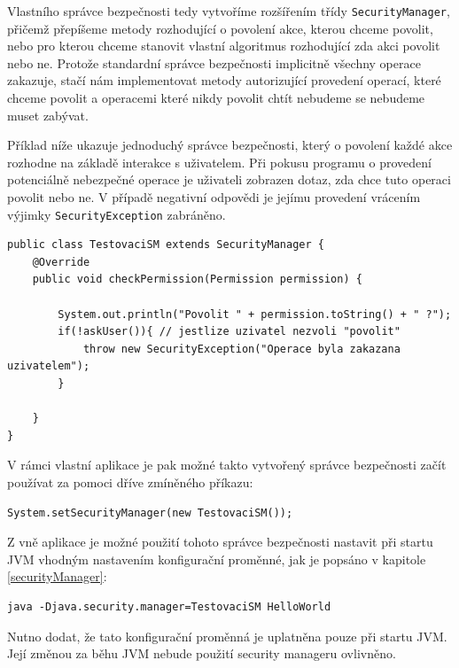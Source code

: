 Vlastního správce bezpečnosti tedy vytvoříme rozšířením třídy {\tt SecurityManager}, přičemž přepíšeme metody rozhodující o povolení akce, kterou chceme povolit, nebo pro kterou chceme stanovit vlastní algoritmus rozhodující zda akci povolit nebo ne.
Protože standardní správce bezpečnosti implicitně všechny operace zakazuje, stačí nám implementovat metody autorizující provedení operací, které chceme povolit a operacemi které nikdy povolit chtít nebudeme se nebudeme muset zabývat.

Příklad níže ukazuje jednoduchý správce bezpečnosti, který o povolení každé akce rozhodne na základě interakce s uživatelem. Při pokusu programu o provedení potenciálně nebezpečné operace je uživateli zobrazen dotaz, zda chce tuto operaci povolit nebo ne. V případě negativní odpovědi je jejímu provedení vrácením výjimky {\tt SecurityException} zabráněno.

\begin{lstlisting}[caption=Jednoduchý správce bezpečnosti, label=TestovaciSM]
public class TestovaciSM extends SecurityManager {
	@Override
	public void checkPermission(Permission permission) {
		
		System.out.println("Povolit " + permission.toString() + " ?");
		if(!askUser()){ // jestlize uzivatel nezvoli "povolit"
			throw new SecurityException("Operace byla zakazana uzivatelem");
		}
		
	}
}
\end{lstlisting}

V rámci vlastní aplikace je pak možné takto vytvořený správce bezpečnosti začít používat za pomoci dříve zmíněného příkazu:

\begin{lstlisting}[caption=Nastavení správce bezpečnosti zevnitř JVM, label=setSM]
System.setSecurityManager(new TestovaciSM());
\end{lstlisting}

Z vně aplikace je možné použití tohoto správce bezpečnosti nastavit při startu JVM vhodným nastavením konfigurační proměnné, jak je popsáno v kapitole \ref{securityManager}:

\begin{lstlisting}[caption=Spuštění aplikace se správcem bezpečnosti, label=runWithSM]
java -Djava.security.manager=TestovaciSM HelloWorld
\end{lstlisting}

Nutno dodat, že tato konfigurační proměnná je uplatněna pouze při startu JVM. Její změnou za běhu JVM nebude použití security manageru ovlivněno.

